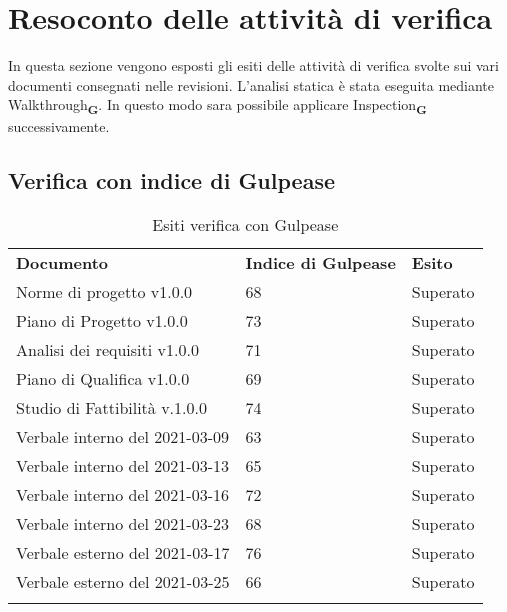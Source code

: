 \section{Resoconto delle attività di verifica}
In questa sezione vengono esposti gli esiti delle attivit\`a di verifica svolte sui vari documenti consegnati nelle revisioni.
L'analisi statica \`e stata eseguita mediante Walkthrough\textsubscript{\textbf{G}}. In questo modo sara possibile applicare Inspection\textsubscript{\textbf{G}} successivamente.
\subsection{Verifica con indice di Gulpease}
\begin{center}
    \centering
    \renewcommand{\arraystretch}{1.8}
    \label{tab:IndiciGulpease}
    \begin{longtable}[!h]{p{150px} p{50px} p{50px}}
        \rowcolor{logo!70}   \textbf{Documento} & \textbf{Indice di Gulpease} & \textbf{Esito} \\
        Norme di progetto v1.0.0            & 68    & Superato \\
        Piano di Progetto v1.0.0            & 73    & Superato \\
        Analisi dei requisiti v1.0.0        & 71    & Superato \\
        Piano di Qualifica v1.0.0           & 69    & Superato \\
        Studio di Fattibilità v.1.0.0       & 74    & Superato \\
        Verbale interno del 2021-03-09      & 63    & Superato \\
        Verbale interno del 2021-03-13      & 65    & Superato \\
        Verbale interno del 2021-03-16      & 72    & Superato \\
        Verbale interno del 2021-03-23      & 68    & Superato \\
        Verbale esterno del 2021-03-17      & 76    & Superato \\
        Verbale esterno del 2021-03-25      & 66    & Superato \\
    \rowcolor{white}\caption{Esiti verifica con Gulpease}            
    \end{longtable}    
\end{center}